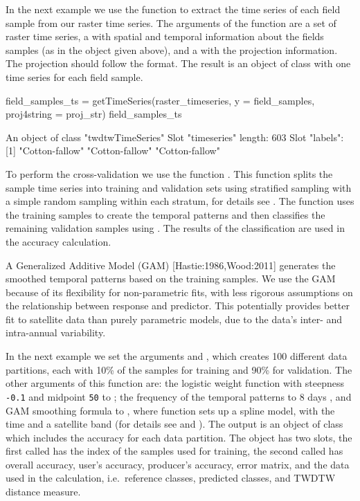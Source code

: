 \documentclass[article,shortnames]{jss}
\begin{document}
In the next example we use the function  to extract
the time series of each field sample from our raster time series. The
arguments of the function are a set of raster time series, a
 with spatial and temporal information about the fields
samples (as in the object  given above), and a
 with the projection information. The projection
should follow the  format. The result is an object of
class  with one time series for each field sample.

\begin{CodeChunk}
\begin{CodeInput}
field_samples_ts = getTimeSeries(raster_timeseries, 
  y = field_samples, proj4string = proj_str)
field_samples_ts
\end{CodeInput}
\begin{CodeOutput}
An object of class "twdtwTimeSeries"
Slot "timeseries" length: 603 
Slot "labels": [1] "Cotton-fallow" "Cotton-fallow" "Cotton-fallow"
\end{CodeOutput}
\end{CodeChunk}

To perform the cross-validation we use the function
. This function splits the sample time series
into training and validation sets using stratified sampling with a
simple random sampling within each stratum, for details see
. The function uses the training
samples to create the temporal patterns and then classifies the
remaining validation samples using . The results of the
classification are used in the accuracy calculation.

A Generalized Additive Model (GAM) {[}Hastie:1986,Wood:2011{]} generates
the smoothed temporal patterns based on the training samples. We use the
GAM because of its flexibility for non-parametric fits, with less
rigorous assumptions on the relationship between response and predictor.
This potentially provides better fit to satellite data than purely
parametric models, due to the data's inter- and intra-annual
variability.

In the next example we set the arguments  and
, which creates 100 different data partitions, each with
10\% of the samples for training and 90\% for validation. The other
arguments of this function are: the logistic weight function with
steepness \texttt{-0.1} and midpoint \texttt{50} to ;
the frequency of the temporal patterns to 8 days , and GAM
smoothing formula to , where function 
sets up a spline model, with  the time and  a satellite
band (for details see  and ). The output
is an object of class  which includes the
accuracy for each data partition. The object has two slots, the first
called  has the index of the samples used for training,
the second called  has overall accuracy, user's accuracy,
producer's accuracy, error matrix, and the data used in the calculation,
i.e.~reference classes, predicted classes, and TWDTW distance measure.
\end{document}

